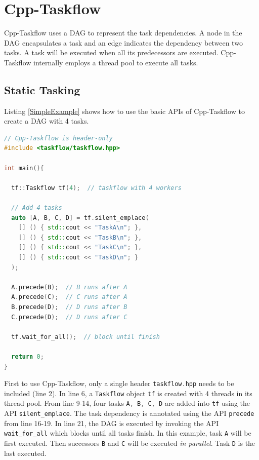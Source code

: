 \documentclass[sigconf]{acmart}
\def\codeinline{\lstinline[basicstyle=\normalsize\color{darkgray},language=C++]}
\begin{document}
\section{Cpp-Taskflow}
Cpp-Taskflow uses a DAG to represent the task dependencies.
A node in the DAG encapsulates a task and an edge
indicates the dependency between two tasks.  A task will be executed when all
its predecessors are executed.  Cpp-Taskflow internally employs a thread pool
to execute all tasks. 

\subsection{Static Tasking}
Listing \ref{SimpleExample} shows how to use the basic APIs of Cpp-Taskflow to create a DAG with 4 tasks.

\begin{lstlisting}[language=C++,label=SimpleExample,caption={A simple example.}]
// Cpp-Taskflow is header-only
#include <taskflow/taskflow.hpp>  

int main(){
  
  tf::Taskflow tf(4);  // taskflow with 4 workers

  // Add 4 tasks
  auto [A, B, C, D] = tf.silent_emplace(
    [] () { std::cout << "TaskA\n"; },               
    [] () { std::cout << "TaskB\n"; },               
    [] () { std::cout << "TaskC\n"; },               
    [] () { std::cout << "TaskD\n"; }                
  );                                                 
                                                     
  A.precede(B);  // B runs after A
  A.precede(C);  // C runs after A                   
  B.precede(D);  // D runs after B                   
  C.precede(D);  // D runs after C                   
                                                     
  tf.wait_for_all();  // block until finish

  return 0;
}
\end{lstlisting} 

First to use Cpp-Taskflow, only a single header \codeinline{taskflow.hpp} needs
to be included (line 2).  In line 6, a \codeinline{Taskflow} object
\codeinline{tf} is created with 4 threads in its thread pool. From line 9-14,
four tasks \codeinline{A, B, C, D} are added into \codeinline{tf} using the API
\codeinline{silent_emplace}.  The task dependency is annotated using the API
\codeinline{precede} from line 16-19. In line 21, the DAG is executed by
invoking the API \codeinline{wait_for_all} which blocks until all tasks finish.
In this example, task \codeinline{A} will be first executed. Then  successors
\codeinline{B} and \codeinline{C} will be executed \emph{in parallel}. Task
\codeinline{D} is the last executed.
\end{document}

